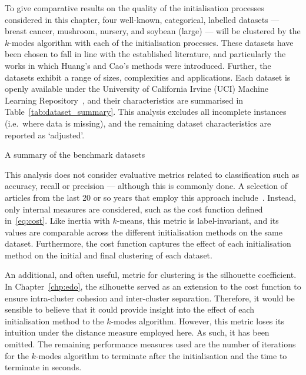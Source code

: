 To give comparative results on the quality of the initialisation processes
considered in this chapter, four well-known, categorical, labelled datasets ---
breast cancer, mushroom, nursery, and soybean (large) --- will be clustered by
the \(k\)-modes algorithm with each of the initialisation processes. These
datasets have been chosen to fall in line with the established literature, and
particularly the works in which Huang's and Cao's methods were introduced.
Further, the datasets exhibit a range of sizes, complexities and applications.
Each dataset is openly available under the University of California Irvine (UCI)
Machine Learning Repository~\cite{Dua2019}, and their characteristics are
summarised in Table~\ref{tab:dataset_summary}. This analysis excludes all
incomplete instances (i.e.\ where data is missing), and the remaining dataset
characteristics are reported as `adjusted'.

\begin{table}
    \resizebox{\textwidth}{!}{}
    \caption{A summary of the benchmark datasets}\label{tab:dataset_summary}
\end{table}

This analysis does not consider evaluative metrics related to classification
such as accuracy, recall or precision --- although this is commonly done. A
selection of articles from the last 20 or so years that employ this approach
include~\cite{%
    Arthur2007,Cao2009,Cao2012,Huang1998,%
    Ng2007,Olaode2014,Schaeffer2007,Sharma2015%
}. Instead, only internal measures are considered, such as the cost function
defined in~\eqref{eq:cost}. Like inertia with \(k\)-means, this metric is
label-invariant, and its values are comparable across the different
initialisation methods on the same dataset. Furthermore, the cost function
captures the effect of each initialisation method on the initial and final
clustering of each dataset.

An additional, and often useful, metric for clustering is the silhouette
coefficient. In Chapter~\ref{chp:edo}, the silhouette served as an extension to
the cost function to ensure intra-cluster cohesion and inter-cluster separation.
Therefore, it would be sensible to believe that it could provide insight into
the effect of each initialisation method to the \(k\)-modes algorithm. However,
this metric loses its intuition under the distance measure employed here. As
such, it has been omitted. The remaining performance measures used are the
number of iterations for the \(k\)-modes algorithm to terminate after the
initialisation and the time to terminate in seconds.


